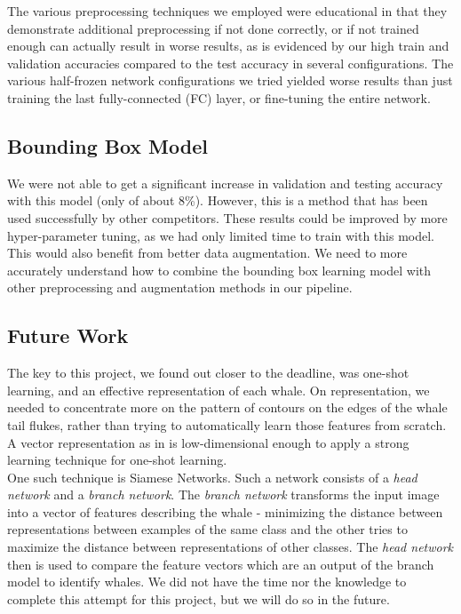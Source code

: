 The various preprocessing techniques we employed were educational in that they demonstrate additional preprocessing if not done correctly, or if not trained enough can actually result in worse results, as is evidenced by our high train and validation accuracies compared to the test accuracy in several configurations. The various half-frozen network configurations we tried yielded worse results than just training the last fully-connected (FC) layer, or fine-tuning the entire network.

\subsection{Bounding Box Model}

We were not able to get a significant increase in validation and testing accuracy with this model (only of about 8\%). However, this is a method that has been used successfully by other competitors\textsuperscript{\cite{martin}}. These results could be improved by more hyper-parameter tuning, as we had only limited time to train with this model. This would also benefit from better data augmentation. We need to more accurately understand how to combine the bounding box learning model with other preprocessing and augmentation methods in our pipeline. 

\subsection{Future Work}

The key to this project, we found out closer to the deadline, was one-shot learning, and an effective representation of each whale. On representation, we needed to concentrate more on the pattern of contours on the edges of the whale tail flukes, rather than trying to automatically learn those features from scratch. A vector representation as in \cite{weideman2017integral} is low-dimensional enough to apply a strong learning technique for one-shot learning.\\

One such technique is Siamese Networks. Such a network consists of a \textit{head network} and a \textit{branch network}. The \textit{branch network} transforms the input image into a vector of features describing the whale - minimizing the distance between representations between examples of the same class and the other tries to maximize the distance between representations of other classes. The \textit{head network} then is used to compare the feature vectors which are an output of the branch model to identify whales. We did not have the time nor the knowledge to complete this attempt for this project, but we will do so in the future.